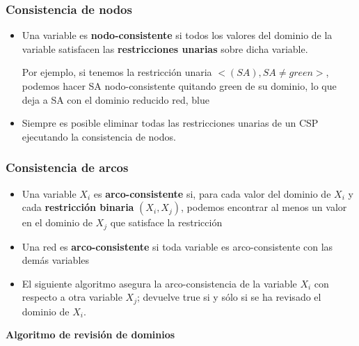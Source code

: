 \documentclass[xcolor=table]{beamer}
\begin{document}
\begin{frame}  \frametitle{Consistencia de nodos} \small

\begin{itemize}
\item Una variable es \textbf{nodo-consistente} si todos los valores del dominio de la variable satisfacen las \textbf{restricciones unarias} sobre dicha variable.

Por ejemplo, si tenemos la restricción unaria $<(SA),SA \neq green>$, podemos hacer SA nodo-consistente quitando green de su dominio, lo que deja a SA con el dominio reducido {red, blue}

\item Siempre es posible eliminar todas las restricciones unarias de un CSP ejecutando la consistencia de nodos.

\end{itemize}

\end{frame} 


\begin{frame}  \frametitle{Consistencia de arcos} \small

\begin{itemize}
\item Una variable $X_i$ es \textbf{arco-consistente} si, para cada valor del dominio de $X_i$ y cada \textbf{restricción binaria} $(X_i,X_j)$, podemos encontrar al menos un valor en el dominio de $X_j$ que satisface la restricción

\item Una red es \textbf{arco-consistente} si toda variable es arco-consistente con las demás variables

\item El siguiente algoritmo asegura la arco-consistencia de la variable $X_i$ con respecto a otra variable $X_j$; devuelve true si y sólo si se ha revisado el dominio de $X_i$.

\end{itemize}

\end{frame} 



\begin{frame}  \Large

\begin{center}
    \textbf{Algoritmo de revisión de dominios}
\end{center}

\end{frame} 
\end{document}
